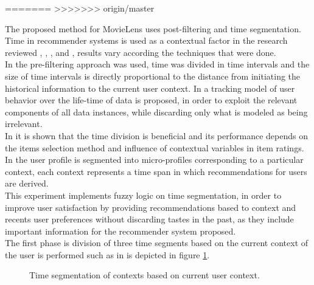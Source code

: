 =======
>>>>>>> origin/master

The proposed method for MovieLens uses post-filtering 
and time segmentation.
Time in recommender systems is used as a contextual factor in the
research reviewed \cite{baltrunas2009context},
\cite{baltrunas2009towards}, \cite{koren2010collaborative}, and
\cite{he2009time}, results vary according the techniques that were
done.\\  In \cite{he2009time} the pre-filtering approach was used, time
was divided in time intervals and the size of time intervals is
directly proportional to the distance from initiating the historical
information to the current user context. In
\cite{koren2010collaborative} a tracking model of user behavior over
the life-time of data is proposed, in order to exploit the relevant
components of all  data instances, while discarding only what is
modeled as being irrelevant.\\In \cite{baltrunas2009context} it is
shown that the time division is beneficial and its performance depends
on the items selection method and influence of contextual variables in
item ratings. In \cite{baltrunas2009towards} the user profile is
segmented into micro-profiles corresponding to a particular context,
each context represents a time span in which recommendations for users
are derived.\\This experiment implements fuzzy logic on time
segmentation, in order to improve user satisfaction by providing
recommendations based to context and recents user preferences without
discarding tastes in the past, as they include important information
for the recommender system proposed. \\The first phase is division of
three time segments based on the current context of the user is
performed such as in is depicted in figure \ref{fig:context-ml}.
\begin{figure}
\captionsetup{justification=centering,margin=2cm,font=footnotesize}
\centering
\setlength\fboxsep{0pt}
\caption{Time segmentation of contexts based on current user
context.}
\label{fig:context-ml}     
\end{figure}
